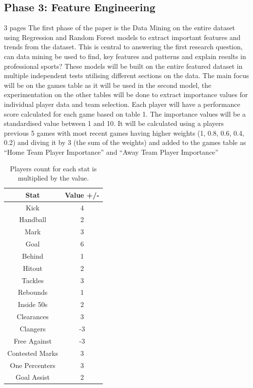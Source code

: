 \documentclass{imc-inf}
\begin{document}
	\subsection{Phase 3: Feature Engineering}
	3 pages
	The first phase of the paper is the Data Mining on the entire dataset using Regression and Random Forest models to extract important features and trends from the dataset. This is central to answering the first research question, can data mining be used to find, key features and patterns and explain results in professional sports?
	These models will be built on the entire featured dataset in multiple independent tests utilising different sections on the data. The main focus will be on the games table as it will be used in the second model, the experimentation on the other tables will be done to extract importance values for individual player data and team selection.
	Each player will have a performance score calculated for each game based on table 1.
	The importance values will be a standardised value between 1 and 10. It will be calculated using a players previous 5 games with most recent games having higher weights (1, 0.8, 0.6, 0.4, 0.2) and diving it by 3 (the sum of the weights) and added to the games table as “Home Team Player Importance” and “Away Team Player Importance”
	\begin{table}[h!]
		\centering	
		\begin{tabular}{| c | c |}
			\hline
			Stat & Value +/- \\
			\hline
			Kick & 4 \\
			\hline
			Handball & 2 \\
			\hline
			Mark & 3 \\
			\hline
			Goal & 6 \\
			\hline
			Behind & 1 \\
			\hline
			Hitout & 2 \\
			\hline
			Tackles & 3 \\
			\hline
			Rebounds & 1 \\
			\hline
			Inside 50s & 2\\
			\hline
			Clearances & 3 \\
			\hline
			Clangers & -3 \\
			\hline
			Free Against & -3 \\
			\hline
			Contested Marks & 3 \\
			\hline
			One Percenters & 3 \\
			\hline
			Goal Assist & 2 \\
			\hline
		\end{tabular}
		\caption{\label {tab:PlayerImportance}Players count for each stat is multiplied by the value.}
		
	\end{table}
	
\end{document}
